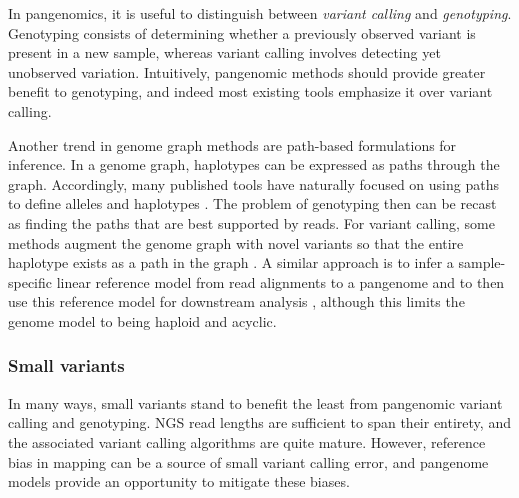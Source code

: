 In pangenomics, it is useful to distinguish between \emph{variant calling} and \emph{genotyping}.
Genotyping consists of determining whether a previously observed variant is present in a new sample, whereas variant calling involves detecting yet unobserved variation.
Intuitively, pangenomic methods should provide greater benefit to genotyping, and indeed most existing tools emphasize it over variant calling.

Another trend in genome graph methods are path-based formulations for inference.
In a genome graph, haplotypes can be expressed as paths through the graph.
Accordingly, many published tools have naturally focused on using paths to define alleles and haplotypes \cite{dilthey2015improved, sibbesen2018accurate,lee2018kourami,hickey2019genotyping,dolzhenko2019expansionhunter}.
The problem of genotyping then can be recast as finding the paths that are best supported by reads.
For variant calling, some methods augment the genome graph with novel variants so that the entire haplotype exists as a path in the graph \cite{sibbesen2018accurate,lee2018kourami,hickey2019genotyping}.
A similar approach is to infer a sample-specific linear reference model from read alignments to a pangenome and to then use this reference model for downstream analysis \cite{Maciuca_2016,Valenzuela_2018}, although this limits the genome model to being haploid and acyclic.

\subsubsection{Small variants}

In many ways, small variants stand to benefit the least from pangenomic variant calling and genotyping.
NGS read lengths are sufficient to span their entirety, and the associated variant calling algorithms are quite mature.
However, reference bias in mapping can be a source of small variant calling error, and pangenome models provide an opportunity to mitigate these biases.

